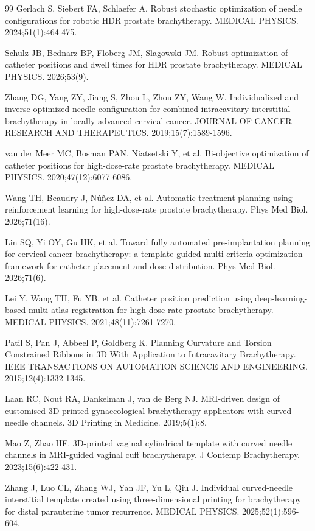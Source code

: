 \documentclass[12pt,twoside,letterpaper]{article}
\begin{document}
\begin{thebibliography}{99}
 Gerlach S, Siebert FA, Schlaefer A. Robust stochastic optimization of needle configurations for robotic HDR prostate brachytherapy. MEDICAL PHYSICS. 2024;51(1):464-475.

 Schulz JB, Bednarz BP, Floberg JM, Slagowski JM. Robust optimization of catheter positions and dwell times for HDR prostate brachytherapy. MEDICAL PHYSICS. 2026;53(9).

 Zhang DG, Yang ZY, Jiang S, Zhou L, Zhou ZY, Wang W. Individualized and inverse optimized needle configuration for combined intracavitary-interstitial brachytherapy in locally advanced cervical cancer. JOURNAL OF CANCER RESEARCH AND THERAPEUTICS. 2019;15(7):1589-1596.

 van der Meer MC, Bosman PAN, Niatsetski Y, et al. Bi-objective optimization of catheter positions for high-dose-rate prostate brachytherapy. MEDICAL PHYSICS. 2020;47(12):6077-6086.

 Wang TH, Beaudry J, Núñez DA, et al. Automatic treatment planning using reinforcement learning for high-dose-rate prostate brachytherapy. Phys Med Biol. 2026;71(16).

 Lin SQ, Yi OY, Gu HK, et al. Toward fully automated pre-implantation planning for cervical cancer brachytherapy: a template-guided multi-criteria optimization framework for catheter placement and dose distribution. Phys Med Biol. 2026;71(6).

 Lei Y, Wang TH, Fu YB, et al. Catheter position prediction using deep-learning-based multi-atlas registration for high-dose rate prostate brachytherapy. MEDICAL PHYSICS. 2021;48(11):7261-7270.

 Patil S, Pan J, Abbeel P, Goldberg K. Planning Curvature and Torsion Constrained Ribbons in 3D With Application to Intracavitary Brachytherapy. IEEE TRANSACTIONS ON AUTOMATION SCIENCE AND ENGINEERING. 2015;12(4):1332-1345.

 Laan RC, Nout RA, Dankelman J, van de Berg NJ. MRI-driven design of customised 3D printed gynaecological brachytherapy applicators with curved needle channels. 3D Printing in Medicine. 2019;5(1):8.

 Mao Z, Zhao HF. 3D-printed vaginal cylindrical template with curved needle channels in MRI-guided vaginal cuff brachytherapy. J Contemp Brachytherapy. 2023;15(6):422-431.

 Zhang J, Luo CL, Zhang WJ, Yan JF, Yu L, Qiu J. Individual curved-needle interstitial template created using three-dimensional printing for brachytherapy for distal parauterine tumor recurrence. MEDICAL PHYSICS. 2025;52(1):596-604.


\end{thebibliography}
\end{document}
